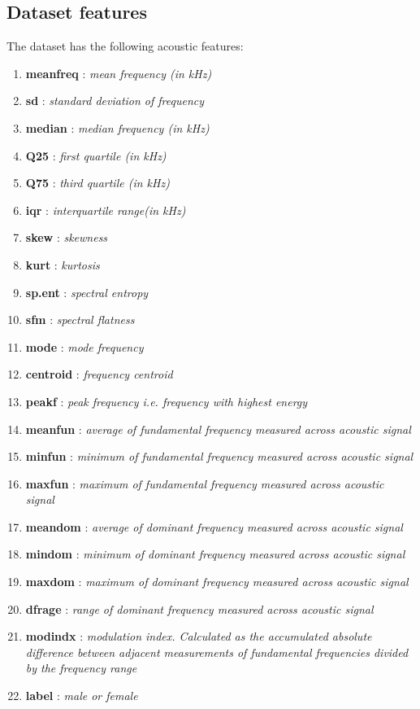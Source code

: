 \documentclass[12pt]{article}
\begin{document}
		\subsection{Dataset features}
			\begin{justify}
				The dataset has the following acoustic features:
				\begin{enumerate}
					\item \textbf{meanfreq} : \textit{mean frequency (in kHz)}
					\item \textbf{sd} : \textit{standard deviation of frequency}
					\item \textbf{median} : \textit{median frequency (in kHz)}
					\item \textbf{Q25} : \textit{first quartile (in kHz)}
					\item \textbf{Q75} : \textit{third quartile (in kHz)}
					\item \textbf{iqr} : \textit{interquartile range(in kHz)}
					\item \textbf{skew} : \textit{skewness}
					\item \textbf{kurt} : \textit{kurtosis}
					\item \textbf{sp.ent} : \textit{spectral entropy}
					\item \textbf{sfm} : \textit{spectral flatness}
					\item \textbf{mode} : \textit{mode frequency}
					\item \textbf{centroid} : \textit{frequency centroid}
					\item \textbf{peakf} : \textit{peak frequency i.e. frequency with highest energy}
					\item \textbf{meanfun} : \textit{average of fundamental frequency measured across acoustic signal}
					\item \textbf{minfun} : \textit{minimum of fundamental frequency measured across acoustic signal}
					\item \textbf{maxfun} : \textit{maximum of fundamental frequency measured across acoustic signal}
					\item \textbf{meandom} : \textit{average of dominant frequency measured across acoustic signal}
					\item \textbf{mindom} : \textit{minimum of dominant frequency measured across acoustic signal}
					\item \textbf{maxdom} : \textit{maximum of dominant frequency measured across acoustic signal}
					\item \textbf{dfrage} : \textit{range of dominant frequency measured across acoustic signal}
					\item \textbf{modindx} : \textit{modulation index. Calculated as the accumulated absolute difference between adjacent measurements of fundamental frequencies divided by the frequency range}
					\item \textbf{label} : \textit{male or female}
				\end{enumerate}
			\end{justify}
\end{document}
